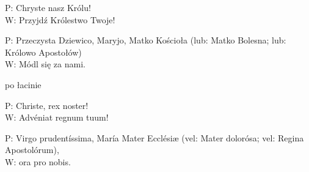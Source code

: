﻿\documentclass[9pt,twoside]{extarticle}
\begin{document}
{\hnr P:} Chryste nasz Królu! \\
{\hnr W:} Przyjdź Królestwo Twoje!


{\hnr P:} Przeczysta Dziewico, Maryjo, Matko Kościoła (lub: Matko Bolesna; lub: Królowo Apostołów) \\
{\hnr W:} Módl się za nami.


{\hnr po łacinie}


{\hnr P:} Christe, rex noster! \\
{\hnr W:} Advéniat regnum tuum!


{\hnr P:} Virgo prudentíssima, María Mater Ecclésiæ (vel: Mater dolorósa; vel: Regina Apostolórum), \\
{\hnr W:} ora pro nobis. 


\clearpage


\null
\pagestyle{empty}
\end{document}

